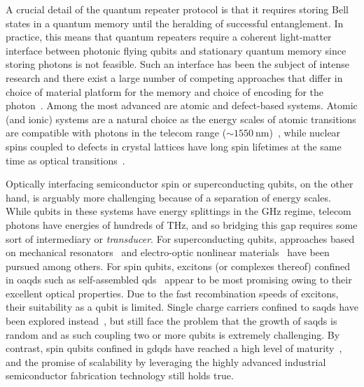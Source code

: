 A crucial detail of the quantum repeater protocol is that it requires storing Bell states in a quantum memory until the heralding of successful entanglement.
In practice, this means that quantum repeaters require a coherent light-matter interface between photonic flying qubits and stationary quantum memory since storing photons is not feasible.
Such an interface has been the subject of intense research and there exist a large number of competing approaches that differ in choice of material platform for the memory and choice of encoding for the photon~\cite{Awschalom2018,Beukers2024}.
Among the most advanced are atomic and defect-based systems.
Atomic (and ionic) systems are a natural choice as the energy scales of atomic transitions are compatible with photons in the telecom range ($\sim\qty{1550}{\nano\meter}$)~\cite{Sangouard2011,Covey2023,Krutyanskiy2023,Liu2024,Kucera2024}, while nuclear spins coupled to defects in crystal lattices have long spin lifetimes at the same time as optical transitions~\cite{Togan2010,Nguyen2019,Bergeron2020,Stolk2024,Knaut2024}.

Optically interfacing semiconductor spin
or superconducting qubits, on the other hand, is arguably more challenging because of a separation of energy scales.
While qubits in these systems have energy splittings in the \unit{\giga\hertz} regime, telecom photons have energies of hundreds of \unit{\tera\hertz}, and so bridging this gap requires some sort of intermediary or \emph{transducer}.
For superconducting qubits, approaches based on mechanical resonators~\cite{Mirhosseini2020} and electro-optic nonlinear materials~\cite{Wang2022} have been pursued among others.
For spin qubits, excitons
(or complexes thereof) confined in \glspl{oaqd} such as self-assembled \glspl{qd}~\cite{Stranski1937,Koguchi1991,Koguchi1993,NobuyukiKoguchi1993} appear to be most promising owing to their excellent optical properties.
Due to the fast recombination speeds of excitons, their suitability as a qubit is limited.
Single charge carriers confined to \glspl{saqd} have been explored instead~\cite{Warburton2013}, but still face the problem that the growth of \glspl{saqd} is random and as such coupling two or more qubits is extremely challenging.
By contrast, spin qubits confined in \glspl{gdqd} have reached a high level of maturity~\cite{Burkard2023,Stano2025}, and the promise of scalability by leveraging the highly advanced industrial semiconductor fabrication technology still holds true.

